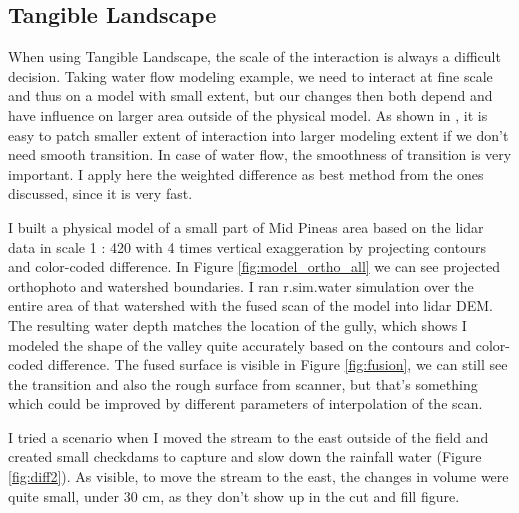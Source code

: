 \documentclass[a4paper,10pt]{article}
\begin{document}
\subsection*{Tangible Landscape}
When using Tangible Landscape, the scale of the interaction is always a difficult decision.
Taking water flow modeling example, we need to interact at fine scale and thus on a model
with small extent, but 
our changes then both depend and have influence on larger area outside of the physical model.
As shown in \cite[Chapter 9 Fire]{Petrasova2015}, it is easy to patch smaller extent of interaction
into larger modeling extent if we don't need smooth transition. In case of water flow,
the smoothness of transition is very important. I apply here the 
weighted difference as best method from the ones discussed, since it is very fast.

I built a physical model of a small part of Mid Pineas area based on the lidar data in scale 1 : 420 with
4 times vertical exaggeration by projecting contours and color-coded difference. In Figure 
\ref{fig:model_ortho_all} we can see projected orthophoto and watershed boundaries.
I ran r.sim.water simulation over the entire area of that watershed with the fused
scan of the model into lidar DEM. The resulting water depth matches the location of the gully, which shows
I modeled the shape of the valley quite accurately based on the contours and color-coded difference.
The fused surface is visible in Figure \ref{fig:fusion}, we can still see
the transition and also the rough surface from scanner, but that's something
which could be improved by different parameters of interpolation of the scan.

I tried a scenario when I moved the stream to the east outside of the field
and created small checkdams to capture and slow down the rainfall water (Figure \ref{fig:diff2}).
As visible, to move the stream to the east, the changes in volume
were quite small, under 30 cm, as they don't show up in the cut and fill figure.
\end{document}
